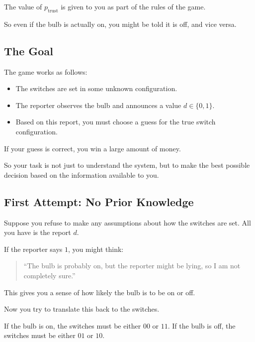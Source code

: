 \documentclass[11pt]{article}
\theoremstyle{remark}
\begin{document}
The value of \(p_{\text{trust}}\) is given to you as part of the rules of the game.

So even if the bulb is actually on, you might be told it is off, and vice versa.

\vspace{3mm}

\subsection{The Goal}

The game works as follows:

\begin{itemize}
    \item The switches are set in some unknown configuration.
    \item The reporter observes the bulb and announces a value \(d \in \{0,1\}\).
    \item Based on this report, you must choose a guess for the true switch configuration.
\end{itemize}

If your guess is correct, you win a large amount of money.

\vspace{2mm}

So your task is not just to understand the system, but to make the best possible decision based on the information available to you.

\vspace{3mm}

\subsection{First Attempt: No Prior Knowledge}

Suppose you refuse to make any assumptions about how the switches are set. All you have is the report \(d\).

If the reporter says \(1\), you might think:

\begin{quote}
``The bulb is probably on, but the reporter might be lying, so I am not completely sure.''
\end{quote}

This gives you a sense of how likely the bulb is to be on or off.

Now you try to translate this back to the switches.

If the bulb is on, the switches must be either \(00\) or \(11\).
If the bulb is off, the switches must be either \(01\) or \(10\).
\end{document}
